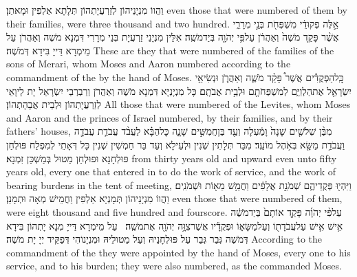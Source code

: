 {וַהֲווֹ מִנְיָנֵיהוֹן לְזַרְעֲיָתְהוֹן תְּלָתָא אַלְפִין וּמָאתַן׃}
{even those that were numbered of them by their families, were three thousand and two hundred.}{}
{אֵ֣לֶּה פְקוּדֵ֔י מִשְׁפְּחֹ֖ת בְּנֵ֣י מְרָרִ֑י אֲשֶׁ֨ר פָּקַ֤ד מֹשֶׁה֙ וְאַהֲרֹ֔ן עַל\maqqaf פִּ֥י יְהֹוָ֖ה בְּיַד\maqqaf מֹשֶֽׁה׃}
{אִלֵּין מִנְיָנֵי זַרְעֲיָת בְּנֵי מְרָרִי דִּמְנָא מֹשֶׁה וְאַהֲרֹן עַל מֵימְרָא דַּייָ בִּידָא דְּמֹשֶׁה׃}
{These are they that were numbered of the families of the sons of Merari, whom Moses and Aaron numbered according to the commandment of the \lord\space by the hand of Moses.}{}
{כׇּֽל\maqqaf הַפְּקֻדִ֡ים אֲשֶׁר֩ פָּקַ֨ד מֹשֶׁ֧ה וְאַהֲרֹ֛ן וּנְשִׂיאֵ֥י יִשְׂרָאֵ֖ל אֶת\maqqaf הַלְוִיִּ֑ם לְמִשְׁפְּחֹתָ֖ם וּלְבֵ֥ית אֲבֹתָֽם׃}
{כָּל מִנְיָנַיָּא דִּמְנָא מֹשֶׁה וְאַהֲרֹן וְרַבְרְבֵי יִשְׂרָאֵל יָת לֵיוָאֵי לְזַרְעֲיָתְהוֹן וּלְבֵית אֲבָהָתְהוֹן׃}
{All those that were numbered of the Levites, whom Moses and Aaron and the princes of Israel numbered, by their families, and by their fathers’ houses,}{}
{מִבֶּ֨ן שְׁלֹשִׁ֤ים שָׁנָה֙ וָמַ֔עְלָה וְעַ֖ד בֶּן\maqqaf חֲמִשִּׁ֣ים שָׁנָ֑ה כׇּל\maqqaf הַבָּ֗א לַעֲבֹ֨ד עֲבֹדַ֧ת עֲבֹדָ֛ה וַעֲבֹדַ֥ת מַשָּׂ֖א בְּאֹ֥הֶל מוֹעֵֽד׃}
{מִבַּר תְּלָתִין שְׁנִין וּלְעֵילָא וְעַד בַּר חַמְשִׁין שְׁנִין כָּל דְּאָתֵי לְמִפְלַח פּוּלְחַן פּוּלְחָנָא וּפוּלְחַן מַטוּל בְּמַשְׁכַּן זִמְנָא׃}
{from thirty years old and upward even unto fifty years old, every one that entered in to do the work of service, and the work of bearing burdens in the tent of meeting,}{}
{וַיִּהְי֖וּ פְּקֻדֵיהֶ֑ם שְׁמֹנַ֣ת אֲלָפִ֔ים וַחֲמֵ֥שׁ מֵא֖וֹת וּשְׁמֹנִֽים׃}
{וַהֲווֹ מִנְיָנֵיהוֹן תְּמָנְיָא אַלְפִין וַחֲמֵישׁ מְאָה וּתְמָנַן׃}
{even those that were numbered of them, were eight thousand and five hundred and fourscore.}{}
{עַל\maqqaf פִּ֨י יְהֹוָ֜ה פָּקַ֤ד אוֹתָם֙ בְּיַד\maqqaf מֹשֶׁ֔ה אִ֥ישׁ אִ֛ישׁ עַל\maqqaf עֲבֹדָת֖וֹ וְעַל\maqqaf מַשָּׂא֑וֹ וּפְקֻדָ֕יו אֲשֶׁר\maqqaf צִוָּ֥ה יְהֹוָ֖ה אֶת\maqqaf מֹשֶֽׁה׃ \petucha }
{עַל מֵימְרָא דַּייָ מְנָא יָתְהוֹן בִּידָא דְּמֹשֶׁה גְּבַר גְּבַר עַל פּוּלְחָנֵיהּ וְעַל מַטוּלֵיהּ וּמִנְיָנוֹהִי דְּפַקֵּיד יְיָ יָת מֹשֶׁה׃}
{According to the commandment of the \lord\space they were appointed by the hand of Moses, every one to his service, and to his burden; they were also numbered, as the \lord\space commanded Moses.}{}
